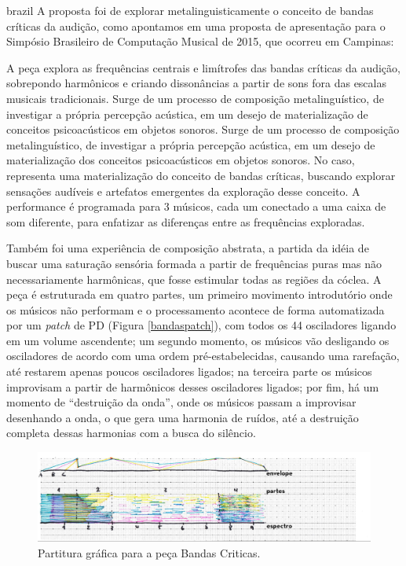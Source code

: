 \begin{otherlanguage*}{brazil}
A proposta foi de explorar metalinguisticamente o conceito de bandas críticas da audição, como apontamos em uma proposta de apresentação para o Simpósio Brasileiro de Computação Musical de 2015, que ocorreu em Campinas:


\begin{citacao}
A peça explora as frequências centrais e limítrofes das bandas críticas da audição, sobrepondo harmônicos e criando dissonâncias a partir de sons fora das escalas musicais tradicionais. Surge de um processo de composição metalinguístico, de investigar a própria percepção acústica, em um desejo de materialização de conceitos psicoacústicos em objetos sonoros. 
Surge de um processo de composição metalinguístico, de investigar a própria percepção acústica, em um desejo de materialização dos conceitos psicoacústicos em objetos sonoros. No caso, representa uma materialização do conceito de bandas críticas, buscando explorar sensações audíveis e artefatos emergentes da exploração desse conceito. A performance é programada para 3 músicos, cada um conectado a uma caixa de som diferente, para enfatizar as diferenças entre as frequências exploradas. \cite{ArianeStolfi2015}
\end{citacao}

Também foi uma experiência de composição abstrata, a partida da idéia de buscar uma saturação sensória formada a partir de frequências puras mas não necessariamente harmônicas, que fosse estimular todas as regiões da cóclea. A peça é estruturada em quatro partes, um primeiro movimento introdutório onde os músicos não performam e o processamento acontece de forma automatizada por um \emph{patch} de PD (Figura \ref{bandaspatch}), com todos os 44 osciladores ligando em um volume ascendente; um segundo momento, os músicos vão desligando os osciladores de acordo com uma ordem pré-estabelecidas, causando uma rarefação, até restarem apenas poucos osciladores ligados; na terceira parte os músicos improvisam a partir de harmônicos desses osciladores ligados; por fim, há um momento de ``destruição da onda'', onde os músicos passam a improvisar desenhando a onda, o que gera uma harmonia de ruídos, até a destruição completa dessas harmonias com a busca do silêncio.

\begin{figure}[htb]
    \caption{\label{bandaspartitura}Partitura gráfica para a peça Bandas Criticas. }
    \begin{center}
    \includegraphics[width=1\linewidth]{pictures/cap3/bandascriticaspartitura}
    \end{center}
\end{figure}


\end{otherlanguage*}
